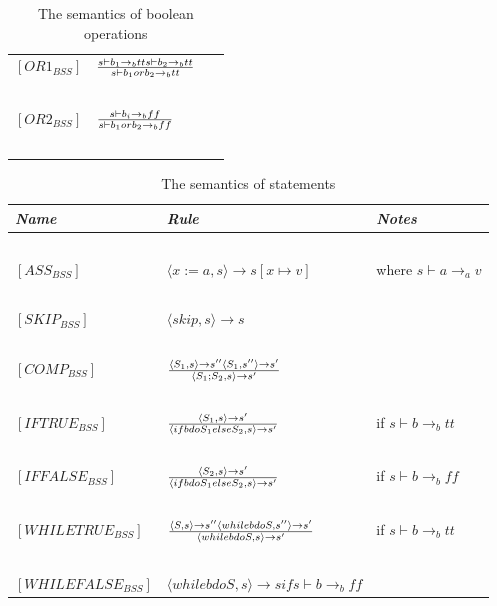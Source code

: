 \begin{table}[h]
\begin{tabular}{|l|l|l|}
	$[OR1_{BSS}]$		& $s \vdash b_{1} \rightarrow_{b} tt  s \vdash b_{2} \rightarrow_{b} tt \over s \vdash b_{1} or b_{2} \rightarrow_{b} tt$				& ~ \\
			~			&															~																			& ~ \\
	$[OR2_{BSS}]$		& $s \vdash b_{i} \rightarrow_{b} ff \over s \vdash b_{1} or b_{2} \rightarrow_{b} ff$													& ~ \\
			~			&															~																			& ~ \\
	\hline
	\end{tabular}
	\label{tab:semantics_boolean}
	\caption{The semantics of boolean operations}
\end{table}

\begin{table}[h]
	\begin{tabular}{|l|l|l|}
	\hline
	\emph{Name}			& \emph{Rule}																															& \emph{Notes} \\ \hline
			~			&															~																			& ~ \\
	$[ASS_{BSS}]$		& $\langle x := a,s \rangle \rightarrow s[x \mapsto v]$																					& where $s \vdash a \rightarrow_{a} v$ \\
			~			&															~																			& ~ \\
	$[SKIP_{BSS}]$		& $\langle skip, s \rangle \rightarrow s$																								& ~ \\
			~			&															~																			& ~ \\
	$[COMP_{BSS}]$		& $\langle S_{1},s \rangle \rightarrow s''  \langle S_{1},s'' \rangle \rightarrow s'  \over \langle S_{1};S_{2},s \rangle \rightarrow s'$	& ~ \\
			~			&															~																			& ~ \\
	$[IFTRUE_{BSS}]$	& $\langle S_{1},s \rangle \rightarrow s' \over \langle if b do S_{1} else S_{2},s \rangle \rightarrow s'	$							& if $s \vdash b \rightarrow_{b} tt$\\
			~			&															~																			& ~ \\
	$[IFFALSE_{BSS}]$	& $\langle S_{2},s \rangle \rightarrow s' \over \langle if b do S_{1} else S_{2},s \rangle \rightarrow s'	$							& if $s \vdash b \rightarrow_{b} ff$\\
			~			&															~																			& ~ \\
	$[WHILETRUE_{BSS}]$	& $\langle S,s \rangle \rightarrow s'' \langle while b do S,s'' \rangle \rightarrow s' \over \langle while b do S,s \rangle \rightarrow s'	$ & if $s \vdash b \rightarrow_{b} tt$\\
			~			&															~																			& ~ \\
	$[WHILEFALSE_{BSS}]$& $\langle while b do S,s \rangle \rightarrow s if s \vdash b \rightarrow_{b} ff $														& ~ \\
	\hline
	\end{tabular}
	\label{tab:semantics_statements}
	\caption{The semantics of statements}
\end{table}